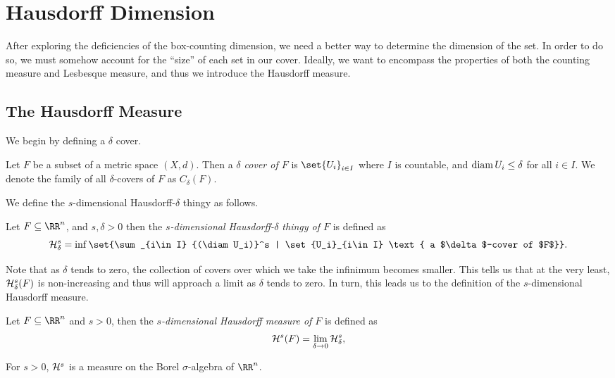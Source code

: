 
\chapter{Hausdorff Dimension}

After exploring the deficiencies of the box-counting dimension, we need a better way to determine the dimension of the set.
In order to do so, we must somehow account for the ``size'' of each set in our cover.
Ideally, we want to encompass the properties of both the counting measure and Lesbesque measure, and thus we introduce the Hausdorff measure.

\section{The Hausdorff Measure}

We begin by defining a $\delta$ cover.
\begin{definition}
	Let $F$ be a subset of a metric space $(X,d)$.
	Then a \textit{$\delta$ cover of $F$} is $\set{U_i}_{i\in I}$ where $I$ is countable, and $\operatorname{diam} U_i \leq\delta$ for all $i\in I$.
	We denote the family of all $\delta$-covers of $F$ as $C_\delta(F)$.
\end{definition}

We define the $s$-dimensional Hausdorff-$\delta$ thingy as follows.

\begin{definition}
	Let $F\subseteq\RR^n$, and $s,\delta>0$ then the \textit{$s$-dimensional Hausdorff-$\delta$ thingy of $F$} is defined as
	\[
		\hm^s_\delta=\inf\set{\sum_{i\in I} {(\diam U_i)}^s | \set{U_i}_{i\in I} \text{ a $\delta$-cover of $F$}}.
	\]
\end{definition}
Note that as $\delta$ tends to zero, the collection of covers over which we take the infinimum becomes smaller.
This tells us that at the very least, $\mathcal{H}^s_\delta(F)$ is non-increasing and thus will approach a limit as $\delta$ tends to zero.
In turn, this leads us to the definition of the $s$-dimensional Hausdorff measure.

\begin{definition}
	Let $F\subseteq\RR^n$ and $s>0$, then the \textit{$s$-dimensional Hausdorff measure of $F$} is defined as
	\[
		\mathcal{H}^s(F) = \lim_{\delta\rightarrow0} \mathcal{H}^s_\delta,
	\]
\end{definition}

\begin{thm}
	For $s>0$, $\mathcal{H}^s$ is a measure on the Borel $\sigma$-algebra of $\RR^n$.
\end{thm}

